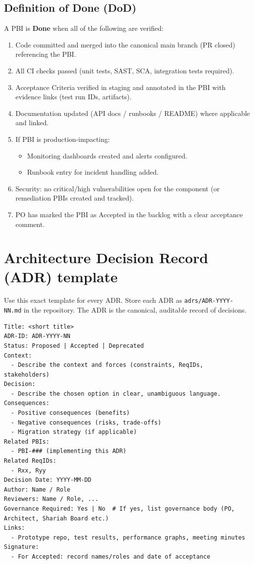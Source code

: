 \documentclass[11pt,a4paper]{article}
\begin{document}
\subsection{Definition of Done (DoD)}
A PBI is \textbf{Done} when all of the following are verified:
\begin{enumerate}[leftmargin=*]
  \item Code committed and merged into the canonical main branch (PR closed) referencing the PBI.
  \item All CI checks passed (unit tests, SAST, SCA, integration tests required).
  \item Acceptance Criteria verified in staging and annotated in the PBI with evidence links (test run IDs, artifacts).
  \item Documentation updated (API docs / runbooks / README) where applicable and linked.
  \item If PBI is production-impacting:
    \begin{itemize}
      \item Monitoring dashboards created and alerts configured.
      \item Runbook entry for incident handling added.
    \end{itemize}
  \item Security: no critical/high vulnerabilities open for the component (or remediation PBIs created and tracked).
  \item PO has marked the PBI as Accepted in the backlog with a clear acceptance comment.
\end{enumerate}

\section{Architecture Decision Record (ADR) template}\label{sec:adr_template}
Use this exact template for every ADR. Store each ADR as \texttt{adrs/ADR-YYYY-NN.md} in the repository. The ADR is the canonical, auditable record of decisions.

\begin{lstlisting}[basicstyle=\ttfamily\small, frame=single, breaklines=true, breakatwhitespace=true]
Title: <short title>
ADR-ID: ADR-YYYY-NN
Status: Proposed | Accepted | Deprecated
Context:
  - Describe the context and forces (constraints, ReqIDs, stakeholders)
Decision:
  - Describe the chosen option in clear, unambiguous language.
Consequences:
  - Positive consequences (benefits)
  - Negative consequences (risks, trade-offs)
  - Migration strategy (if applicable)
Related PBIs:
  - PBI-### (implementing this ADR)
Related ReqIDs:
  - Rxx, Ryy
Decision Date: YYYY-MM-DD
Author: Name / Role
Reviewers: Name / Role, ...
Governance Required: Yes | No  # If yes, list governance body (PO, Architect, Shariah Board etc.)
Links:
  - Prototype repo, test results, performance graphs, meeting minutes
Signature:
  - For Accepted: record names/roles and date of acceptance
\end{lstlisting}
\end{document}

